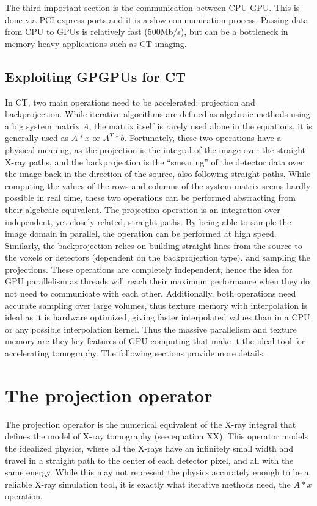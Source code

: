 The third important section is the communication between CPU-GPU. This is done via PCI-express ports and it is a slow communication process. Passing data from CPU to GPUs is relatively fast (500Mb/s), but can be a bottleneck in memory-heavy applications such as CT imaging.



\subsection{Exploiting GPGPUs for CT}

In CT, two main operations need to be accelerated: projection and backprojection. While iterative algorithms are defined as algebraic methods using a big system matrix $A$, the matrix itself is rarely used alone in the equations, it is generally used as $A*x$ or $A^T*b$. Fortunately, these two operations have a physical meaning, as the projection is the integral of the image over the straight X-ray paths, and the backprojection is the ``smearing'' of the detector data over the image back in the direction of the source, also following straight paths. While computing the values of the rows and columns of the system matrix seems hardly possible in real time, these two operations can be performed abstracting from their algebraic equivalent. The projection operation is an integration over independent, yet closely related, straight paths. By being able to sample the image domain in parallel, the operation can be performed at high speed. Similarly, the backprojection relies on building straight lines from the source to the voxels or detectors (dependent on the backprojection type), and sampling the projections. These operations are completely independent, hence the idea for GPU parallelism as threads will reach their maximum performance when they do not need to communicate with each other.  Additionally, both operations need accurate sampling over large volumes, thus texture memory with interpolation is ideal as it is hardware optimized, giving faster interpolated values than in a CPU or any possible interpolation kernel. Thus the massive parallelism and texture memory are they key features of GPU computing that make it the ideal tool for accelerating tomography. The following sections provide more details.

\section{The projection operator}
The projection operator is the numerical equivalent of the X-ray integral that defines the model of X-ray tomography (see equation XX). This operator models the idealized physics, where all the X-rays have an infinitely small width and travel in a straight path to the center of each detector pixel, and all with the same energy. While this may not represent the physics accurately enough to be a reliable X-ray  simulation tool, it is exactly what iterative methods need, the $A*x$ operation. 


